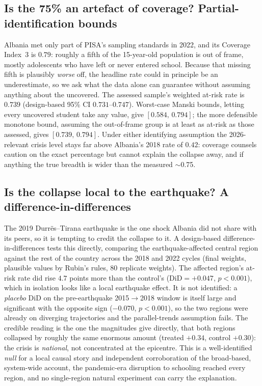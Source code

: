 \subsection{Is the 75\% an artefact of coverage? Partial-identification bounds}
Albania met only part of PISA's sampling standards in 2022, and its Coverage Index~3 is
$0.79$: roughly a fifth of the 15-year-old population is out of frame, mostly
adolescents who have left or never entered school. Because that missing fifth is
plausibly \emph{worse} off, the headline rate could in principle be an underestimate, so
we ask what the data alone can guarantee without assuming anything about the uncovered.
The assessed sample's weighted at-risk rate is $0.739$ (design-based 95\% CI
$0.731$--$0.747$). Worst-case Manski bounds, letting every uncovered student take any
value, give $[0.584,\,0.794]$; the more defensible monotone bound, assuming the
out-of-frame group is at least as at-risk as those assessed, gives
$[\mathbf{0.739},\,\mathbf{0.794}]$. Under either identifying assumption the 2026-relevant
crisis level stays far above Albania's 2018 rate of $0.42$: coverage counsels caution on
the exact percentage but cannot explain the collapse away, and if anything the true
breadth is wider than the measured $\sim$0.75.

\subsection{Is the collapse local to the earthquake? A difference-in-differences}
The 2019 Durr\"es--Tirana earthquake is the one shock Albania did not share with its
peers, so it is tempting to credit the collapse to it. A design-based
difference-in-differences tests this directly, comparing the earthquake-affected central
region against the rest of the country across the 2018 and 2022 cycles (final weights,
plausible values by Rubin's rules, 80 replicate weights). The affected region's at-risk
rate did rise $4.7$ points more than the control's ($\mathrm{DiD}=+0.047$,
$p<0.001$), which in isolation looks like a local earthquake effect. It is not
identified: a \emph{placebo} DiD on the pre-earthquake 2015$\rightarrow$2018 window is
itself large and significant with the opposite sign ($-0.070$, $p<0.001$), so the two
regions were already on diverging trajectories and the parallel-trends assumption fails.
The credible reading is the one the magnitudes give directly, that both regions
collapsed by roughly the same enormous amount (treated $+0.34$, control $+0.30$): the
crisis is \emph{national}, not concentrated at the epicentre. This is a well-identified
\emph{null} for a local causal story and independent corroboration of the broad-based,
system-wide account, the pandemic-era disruption to schooling reached every region, and
no single-region natural experiment can carry the explanation.

